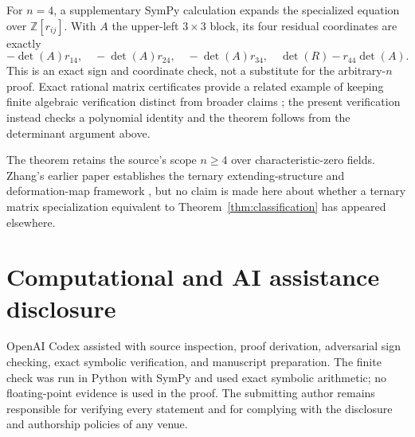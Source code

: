 \documentclass[11pt]{article}
\begin{document}
For $n=4$, a supplementary SymPy \cite{MeurerEtAl2017} calculation expands
the specialized equation over $\mathbb Z[r_{ij}]$.  With $A$ the upper-left
$3\times3$ block, its four residual coordinates are exactly
\[
 -\det(A)r_{14},\quad -\det(A)r_{24},\quad -\det(A)r_{34},\quad
 \det(R)-r_{44}\det(A).
\]
This is an exact sign and coordinate check, not a substitute for the
arbitrary-$n$ proof.  Exact rational matrix certificates provide a related
example of keeping finite algebraic verification distinct from broader
claims \cite{ZengLiuRatnavelu2026}; the present verification instead checks
a polynomial identity and the theorem follows from the determinant argument
above.

The theorem retains the source's scope $n\geq4$ over characteristic-zero
fields.  Zhang's earlier paper establishes the ternary extending-structure
and deformation-map framework \cite{Zhang2022}, but no claim is made here
about whether a ternary matrix specialization equivalent to
Theorem~\ref{thm:classification} has appeared elsewhere.

\section*{Computational and AI assistance disclosure}

OpenAI Codex assisted with source inspection, proof derivation, adversarial
sign checking, exact symbolic verification, and manuscript preparation.
The finite check was run in Python with SymPy and used exact symbolic
arithmetic; no floating-point evidence is used in the proof.  The submitting
author remains responsible for verifying every statement and for complying
with the disclosure and authorship policies of any venue.



\end{document}

